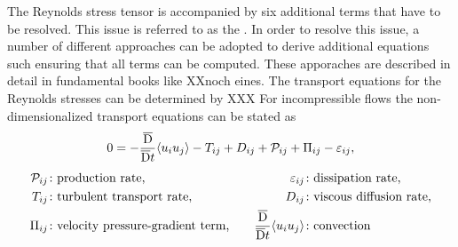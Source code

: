 The Reynolds stress tensor is accompanied by six additional terms that have to be resolved.
This issue is referred to as the  \citep{wilcox_turbulence_2006}.
%
In order to resolve this issue, a number of different approaches can be adopted  to derive additional equations such ensuring that all terms can be computed.  These apporaches are described in detail in fundamental books like \citet{wilcox_turbulence_2006,pope_turbulent_2015} XXnoch eines.
The transport equations for the Reynolds stresses can be  determined by XXX \citep{mansour_reynolds-stress_1988}
For incompressible flows the non-dimensionalized transport equations can be stated as 
\begin{gather}
    0 = -\frac{\overline{\mathrm{D}}}{\overline{\mathrm{D}}t} \langle u_i u_j \rangle - T_{ij} + D_{ij} + \mathcal{P}_{ij} + \Pi_{ij} - \varepsilon_{ij}, \\[4pt]
    \begin{aligned}
        \mathcal{P}_{ij} &\colon \text{production rate,} & \quad \varepsilon_{ij} &\colon \text{dissipation rate,} \\
        T_{ij} &\colon \text{turbulent transport rate,} & \quad D_{ij} &\colon \text{viscous diffusion rate,} \\
        \Pi_{ij} &\colon \text{velocity pressure-gradient term,} & \quad \frac{\overline{\mathrm{D}}}{\overline{\mathrm{D}}t} \langle u_i u_j \rangle &\colon \text{convection}
    \end{aligned} \notag
\end{gather}


